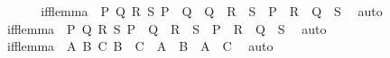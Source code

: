 \begin{isabellebody}
%
\isadelimproof
%
\endisadelimproof
%
\isatagproof
{}\isamarkupfalse%
\ {\isacharminus}{\kern0pt}\ \isanewline
\ \ \isamarkupfalse%
\ iff{\isacharunderscore}{\kern0pt}lemma\ {\isacharcolon}{\kern0pt}\ {\isachardoublequoteopen}{\isasymAnd}P\ Q\ R\ S{\isachardot}{\kern0pt}\ {\isacharparenleft}{\kern0pt}P\ {\isasymlongleftrightarrow}\ Q{\isacharparenright}{\kern0pt}\ {\isasymLongrightarrow}\ {\isacharparenleft}{\kern0pt}Q\ {\isasymLongrightarrow}\ R\ {\isasymlongleftrightarrow}\ S{\isacharparenright}{\kern0pt}\ {\isasymLongrightarrow}\ {\isacharparenleft}{\kern0pt}P\ {\isasymand}\ R{\isacharparenright}{\kern0pt}\ {\isasymlongleftrightarrow}\ {\isacharparenleft}{\kern0pt}Q\ {\isasymand}\ S{\isacharparenright}{\kern0pt}{\isachardoublequoteclose}\ \isamarkupfalse%
\ auto\isanewline
\ \ \isamarkupfalse%
\ iff{\isacharunderscore}{\kern0pt}lemma{}\ {\isacharcolon}{\kern0pt}\ {\isachardoublequoteopen}{\isasymAnd}P\ Q\ R\ S{\isachardot}{\kern0pt}\ {\isacharparenleft}{\kern0pt}P\ {\isasymlongleftrightarrow}\ Q{\isacharparenright}{\kern0pt}\ {\isasymLongrightarrow}\ {\isacharparenleft}{\kern0pt}R\ {\isasymlongleftrightarrow}\ S{\isacharparenright}{\kern0pt}\ {\isasymLongrightarrow}\ {\isacharparenleft}{\kern0pt}P\ {\isasymlongleftrightarrow}\ R{\isacharparenright}{\kern0pt}\ {\isasymlongleftrightarrow}\ {\isacharparenleft}{\kern0pt}Q\ {\isasymlongleftrightarrow}\ S{\isacharparenright}{\kern0pt}{\isachardoublequoteclose}\ \isamarkupfalse%
\ auto\isanewline
\ \ \isamarkupfalse%
\ iff{\isacharunderscore}{\kern0pt}lemma{}\ {\isacharcolon}{\kern0pt}\ {\isachardoublequoteopen}{\isasymAnd}A\ B\ C{\isachardot}{\kern0pt}\ B\ {\isacharequal}{\kern0pt}\ C\ {\isasymLongrightarrow}\ {\isacharparenleft}{\kern0pt}A\ {\isacharequal}{\kern0pt}\ B{\isacharparenright}{\kern0pt}\ {\isasymlongleftrightarrow}\ {\isacharparenleft}{\kern0pt}A\ {\isacharequal}{\kern0pt}\ C{\isacharparenright}{\kern0pt}{\isachardoublequoteclose}\ \isamarkupfalse%
\ auto\isanewline
\isanewline
\ \ \isamarkupfalse%

\end{isabellebody}
